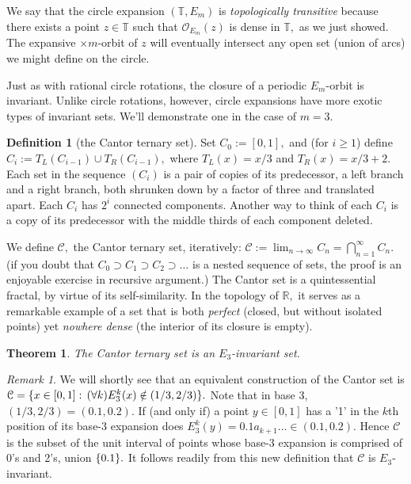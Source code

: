 \documentclass[12pt, letterpaper, oneside]{book}
\newcommand{\R}{\mathbb{R}}
\newcommand{\T}{\mathbb{T}}
\DeclarePairedDelimiter{\set}{\lbrace}{\rbrace}
\theoremstyle{plain}
\newtheorem{theorem}{Theorem}
\theoremstyle{definition}
\newtheorem{definition}{Definition}
\theoremstyle{remark}
\newtheorem*{remark}{Remark}
\begin{document}
We say that the circle expansion $(\T,E_m)$ is \textit{topologically transitive} because there exists a point $z \in \T$ such that $\mathcal{O}_{E_m}(z)$  is dense in $\T,$ as we just showed. The expansive $\times m$-orbit of $z$ will eventually intersect any open set (union of arcs) we might define on the circle. 

Just as with rational circle rotations, the closure of a periodic $E_m$-orbit is invariant. Unlike circle rotations, however, circle expansions have more exotic types of invariant sets. We'll demonstrate one in the case of $m=3.$

\begin{definition}[the Cantor ternary set]

Set $C_0 := [0,1],$ and (for $i \geq 1$) define $C_{i} := T_L(C_{i-1}) \cup T_R(C_{i-1}),$ where $T_L(x) = x/3$ and $T_R(x) = x/3 + 2.$ Each set in the sequence $(C_i)$ is a pair of copies of its predecessor, a left branch and a right branch, both shrunken down by a factor of three and translated apart. Each $C_i$ has $2^i$ connected components. Another way to think of each $C_i$ is a copy of its predecessor with the middle thirds of each component deleted.

We define $\mathcal{C},$ the Cantor ternary set, iteratively:  $\mathcal{C} := \lim_{n \to \infty}C_n = \bigcap_{n=1}^{\infty}C_n.$ (if you doubt that $C_0 \supset C_1 \supset C_2 \supset \ldots$ is a nested sequence of sets, the proof is an enjoyable exercise in recursive argument.) The Cantor set is a quintessential fractal, by virtue of its self-similarity. In the topology of $\R,$ it serves as a remarkable example of a set that is both \textit{perfect} (closed, but without isolated points) yet \textit{nowhere dense} (the interior of its closure is empty). 
\end{definition}


\begin{theorem}
The Cantor ternary set is an $E_3$-invariant set.
\end{theorem}

\begin{remark}
We will shortly see that an equivalent construction of the Cantor set is $\mathcal{C} = \set{x \in [0,1]: \, (\forall k) E_3^k(x)\notin (1/3,2/3)}.$ Note that in base 3, $(1/3,2/3) = (0.1,0.2).$ If (and only if) a point $y\in[0,1]$ has a '1' in the $k$th position of its base-3 expansion does $E_3^k(y) = 0.1a_{k+1}\ldots \in (0.1, 0.2).$ Hence $\mathcal{C}$ is the subset of the unit interval of points whose base-3 expansion is comprised of 0's and 2's, union $\set{0.1}.$ It follows readily from this new definition that $\mathcal{C}$ is $E_3$-invariant. 
\end{remark}
\end{document}
